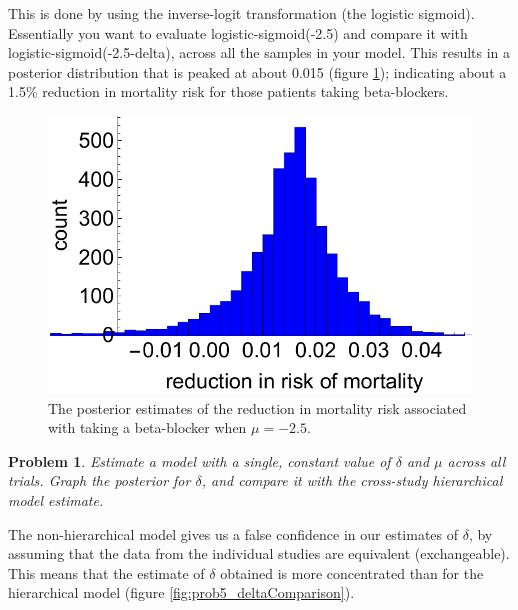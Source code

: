 \documentclass{article}
\newtheorem{problem}{Problem}[section]
\begin{document}
This is done by using the inverse-logit transformation (the logistic sigmoid). Essentially you want to evaluate logistic-sigmoid(-2.5) and compare it with logistic-sigmoid(-2.5-delta), across all the samples in your model. This results in a posterior distribution that is peaked at about 0.015 (figure \ref{fig:prob5_risk}); indicating about a 1.5\% reduction in mortality risk for those patients taking beta-blockers.

\begin{figure}[ht]
	\centerline{\includegraphics[width=1\textwidth]{figures/prob5_crossStudyRiskReduction.pdf}}
	\caption{The posterior estimates of the reduction in mortality risk associated with taking a beta-blocker when $\mu=-2.5$.}\label{fig:prob5_risk}
\end{figure}

\begin{problem}
	Estimate a model with a single, constant value of $\delta$ and $\mu$ across all trials. Graph the posterior for $\delta$, and compare it with the cross-study hierarchical model estimate.
\end{problem}

The non-hierarchical model gives us a false confidence in our estimates of $\delta$, by assuming that the data from the individual studies are equivalent (exchangeable). This means that the estimate of $\delta$ obtained is more concentrated than for the hierarchical model (figure \ref{fig:prob5_deltaComparison}).
\end{document}
